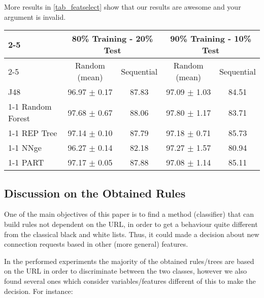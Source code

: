 \documentclass{llncs}
\begin{document}

More results in \ref{tab_featselect} show that our results are awesome and your argument is invalid.

\begin{table*}[htpb]
\centering
 \caption{\label{tab_featselect} Percentage of correctly classified patterns for non-balanced data}
{\small
\begin{tabular}{|l|c|c|c|c|}
\cline{2-5}
\multicolumn{1}{l|}{} & \multicolumn{2}{c|}{80\% Training - 20\% Test} & \multicolumn{2}{c|}{90\% Training - 10\% Test} \\ 
\cline{2-5}
\multicolumn{1}{l|}{} & Random (mean) & Sequential & Random (mean) & Sequential \\ 
\hline
J48 & 96.97 $\pm$ 0.17 & 87.83 & 97.09 $\pm$ 1.03 & 84.51 \\ 
\cline{1-1}
Random Forest & 97.68 $\pm$ 0.67 & 88.06 & 97.80 $\pm$ 1.17 & 83.71 \\ 
\cline{1-1}
REP Tree & 97.14 $\pm$ 0.10 & 87.79 & 97.18 $\pm$ 0.71 & 85.73 \\ 
\cline{1-1}
NNge & 96.27 $\pm$ 0.14 & 82.18 & 97.27 $\pm$ 1.57 & 80.94 \\ 
\cline{1-1}
PART & 97.17 $\pm$ 0.05 & 87.88 & 97.08 $\pm$ 1.14 & 85.11 \\ 
\hline
\end{tabular}
}
\end{table*}

%
\subsection{Discussion on the Obtained Rules}
\label{sec:rulesdiscussion}

One of the main objectives of this paper is to find a method (classifier) that can build rules not dependent on the URL, in order to get a behaviour quite different from the classical black and white lists. Thus, it could made a decision about new connection requests based in other (more general) features.

In the performed experiments the majority of the obtained rules/trees are based on the URL in order to discriminate between the two classes, however we also found several ones which consider variables/features different of this to make the decision. For instance:\\
\end{document}
